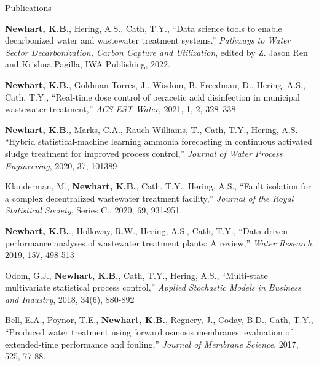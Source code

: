 \documentclass{resume} %
\begin{document}
\begin{rSection}{Publications}
\begin{etaremune}
	\item \textbf{Newhart, K.B.}, Hering, A.S., Cath, T.Y., ``Data science tools to enable decarbonized water and wastewater treatment systems.'' \emph{Pathways to Water Sector Decarbonization, Carbon Capture and Utilization}, edited by Z. Jason Ren and Krishna Pagilla, IWA Publishing, 2022.

	\item \textbf{Newhart, K.B.}, Goldman-Torres, J., Wisdom, B. Freedman, D., Hering, A.S., Cath, T.Y., ``Real-time dose control of peracetic acid disinfection in municipal wastewater treatment,'' \emph{ACS EST Water}, 2021, 1, 2, 328–338

	\item \textbf{Newhart, K.B.}, Marks, C.A., Rauch-Williams, T., Cath, T.Y., Hering, A.S. ``Hybrid statistical-machine learning ammonia forecasting in continuous activated sludge treatment for improved process control,'' \emph{Journal of Water Process Engineering}, 2020, 37, 101389

	\item Klanderman, M., \textbf{Newhart, K.B.}, Cath. T.Y., Hering, A.S., ``Fault isolation for a complex decentralized wastewater treatment facility,'' \emph{Journal of the Royal Statistical Society}, Series C., 2020, 69, 931-951.

	\item \textbf{Newhart, K.B.}., Holloway, R.W., Hering, A.S., Cath, T.Y., ``Data-driven performance analyses of wastewater treatment plants: A review,'' \emph{Water Research}, 2019, 157, 498-513

	\item Odom, G.J., \textbf{Newhart, K.B.}, Cath, T.Y., Hering, A.S., ``Multi-state multivariate statistical process control,'' \emph{Applied Stochastic Models in Business and Industry}, 2018, 34(6), 880-892

	\item Bell, E.A., Poynor, T.E., \textbf{Newhart, K.B.}, Regnery, J., Coday, B.D., Cath, T.Y., ``Produced water treatment using forward osmosis membranes: evaluation of extended-time performance and fouling,'' \emph{Journal of Membrane Science}, 2017, 525, 77-88.
\end{etaremune}

\end{rSection}


\end{document}
